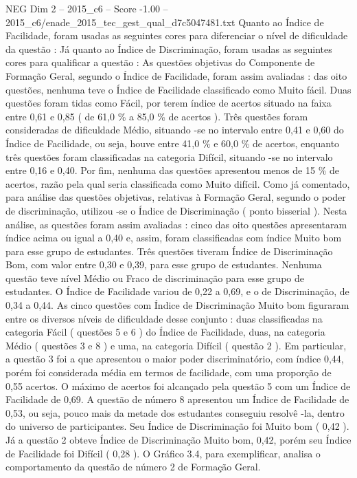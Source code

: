 \begin{textsample}{NEG Dim 2 – 2015\_c6 – Score -1.00 – 2015\_c6/enade\_2015\_tec\_gest\_qual\_d7c5047481.txt}
Quanto ao Índice de Facilidade, foram usadas as seguintes cores para diferenciar o nível de dificuldade da questão : Já quanto ao Índice de Discriminação, foram usadas as seguintes cores para qualificar a questão : As questões objetivas do Componente de Formação Geral, segundo o Índice de Facilidade, foram assim avaliadas : das oito questões, nenhuma teve o Índice de Facilidade classificado como Muito fácil.
Duas questões foram tidas como Fácil, por terem índice de acertos situado na faixa entre 0,61 e 0,85 ( de 61,0 \% a 85,0 \% de acertos ).
Três questões foram consideradas de dificuldade Médio, situando -se no intervalo entre 0,41 e 0,60 do Índice de Facilidade, ou seja, houve entre 41,0 \% e 60,0 \% de acertos, enquanto três questões foram classificadas na categoria Difícil, situando -se no intervalo entre 0,16 e 0,40.
Por fim, nenhuma das questões apresentou menos de 15 \% de acertos, razão pela qual seria classificada como Muito difícil.
Como já comentado, para análise das questões objetivas, relativas à Formação Geral, segundo o poder de discriminação, utilizou -se o Índice de Discriminação ( ponto bisserial ).
Nesta análise, as questões foram assim avaliadas : cinco das oito questões apresentaram índice acima ou igual a 0,40 e, assim, foram classificadas com índice Muito bom para esse grupo de estudantes.
Três questões tiveram Índice de Discriminação Bom, com valor entre 0,30 e 0,39, para esse grupo de estudantes.
Nenhuma questão teve nível Médio ou Fraco de discriminação para esse grupo de estudantes.
O Índice de Facilidade variou de 0,22 a 0,69, e o de Discriminação, de 0,34 a 0,44.
As cinco questões com Índice de Discriminação Muito bom figuraram entre os diversos níveis de dificuldade desse conjunto : duas classificadas na categoria Fácil ( questões 5 e 6 ) do Índice de Facilidade, duas, na categoria Médio ( questões 3 e 8 ) e uma, na categoria Difícil ( questão 2 ).
Em particular, a questão 3 foi a que apresentou o maior poder discriminatório, com índice 0,44, porém foi considerada média em termos de facilidade, com uma proporção de 0,55 acertos.
O máximo de acertos foi alcançado pela questão 5 com um Índice de Facilidade de 0,69.
A questão de número 8 apresentou um Índice de Facilidade de 0,53, ou seja, pouco mais da metade dos estudantes conseguiu resolvê -la, dentro do universo de participantes.
Seu Índice de Discriminação foi Muito bom ( 0,42 ).
Já a questão 2 obteve Índice de Discriminação Muito bom, 0,42, porém seu Índice de Facilidade foi Difícil ( 0,28 ).
O Gráfico 3.4, para exemplificar, analisa o comportamento da questão de número 2 de Formação Geral.

\end{textsample}
